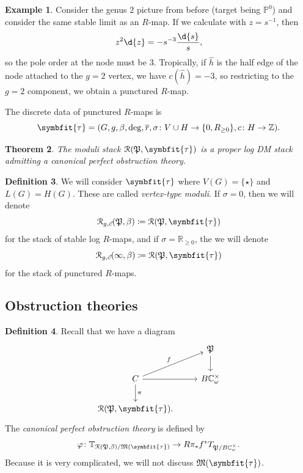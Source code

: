 \documentclass[10pt,oldfontcommands,oneside]{memoir}
\newtheorem{thm}{Theorem}[section]
\theoremstyle{definition}
\newtheorem{defn}[thm]{Definition}
\newtheorem{exm}[thm]{Example}
\theoremstyle{remark}
\theoremstyle{plain}
\theoremstyle{definition}
\theoremstyle{remark}
\newcommand{\R}{\mathbb{R}}
\newcommand{\C}{\mathbb{C}}
\newcommand{\Z}{\mathbb{Z}}
\renewcommand{\P}{\mathbb{P}}
\newcommand{\mc}[1]{\mathcal{#1}}
\newcommand{\mf}[1]{\mathfrak{#1}}
\newcommand{\btau}{\symbfit{\tau}}
\newcommand{\ol}[1]{\overline{#1}}
\newcommand{\1}{\mathbf{1}}
\newcommand{\2}{\mathbf{2}}
\newcommand{\3}{\mathbf{3}}
\begin{document}
\begin{exm}
    Consider the genus $2$ picture from before (target being $\P^0$) and consider the same stable limit as an $R$-map. If we calculate with $z = s^{-1}$, then
    \[ z^2 \d{z} = -s^{-3} \frac{\d{s}}{s}, \]
    so the pole order at the node must be $3$. Tropically, if $\hat{h}$ is the half edge of the node attached to the $g=2$ vertex, we have $c(\hat{h}) = -3$, so restricting to the $g=2$ component, we obtain a punctured $R$-map.
\end{exm}

The discrete data of punctured $R$-maps is
\[ \symbfit{\tau} = (G, g, \beta, \deg, \ol{r}, \sigma\colon V \cup H \to \{0,R_{\geq 0}\}, c \colon H \to \Z). \]

\begin{thm}
    The moduli stack $\mc{R}(\mf{P}, \symbfit{\tau})$ is a proper log DM stack admitting a canonical perfect obstruction theory.
\end{thm}


\begin{defn}
    We will consider $\symbfit{\tau}$ where $V(G) = \{\star\}$ and $L(G) = H(G)$. These are called \textit{vertex-type moduli}. If $\sigma = 0$, then we will denote
    \[ \mc{R}_{g,\vec{c}}(\mf{P}, \beta) \coloneqq \mc{R}(\mf{P}, \symbfit{\tau}) \]
    for the stack of stable log $R$-maps,
    and if $\sigma = \R_{\geq 0}$, the we will denote
    \[ \mc{R}_{g,\vec{c}}(\infty, \beta) \coloneqq \mc{R}(\mf{P}, \btau) \]
    for the stack of punctured $R$-maps.
\end{defn}

\subsection{Obstruction theories}%
\label{sub:The canonical perfect obstruction theory}


\begin{defn}
    Recall that we have a diagram
    \begin{equation*}
    \begin{tikzcd}
        & \mf{P} \ar{d} \\
        C \ar{r} \ar{d}{\pi} \ar{ur}{f} & B \C_{\omega}^{\times} \\
        \mc{R}(\mf{P}, \btau).
    \end{tikzcd}
    \end{equation*}
    The \textit{canonical perfect obstruction theory} is defined by
    \[ \varphi \colon \mathbb{T}_{\mc{R}(\mf{P}, \beta)/\mf{M}(\btau)} \to R \pi_* f^* T_{\mf{P}/B\C_{\omega}^{\times}}. \]
    Because it is very complicated, we will not discuss $\mf{M}(\btau)$.
\end{defn}
\end{document}
